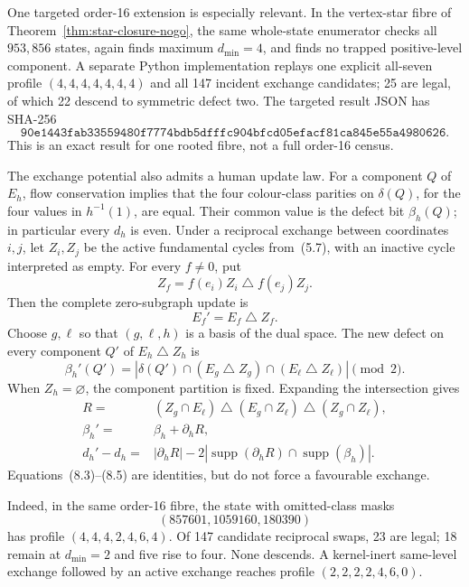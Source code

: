 \documentclass[11pt]{article}
\theoremstyle{definition}
\theoremstyle{remark}
\newcommand{\supp}{\operatorname{supp}}
\newcommand{\symdiff}{\mathbin{\triangle}}
\newcommand{\1}{\mathbf 1}
\begin{document}
One targeted order-16 extension is especially relevant.  In the
vertex-star fibre of Theorem~\ref{thm:star-closure-nogo}, the same
whole-state enumerator checks all \(953{,}856\) states, again finds maximum
\(d_{\min}=4\), and finds no trapped positive-level component.  A separate
Python implementation replays one explicit all-seven profile
\((4,4,4,4,4,4,4)\) and all 147 incident exchange candidates; 25 are
legal, of which 22 descend to symmetric defect two.  The targeted result
JSON has SHA-256
\[
\texttt{90e1443fab33559480f7774bdb5dfffc904bfcd05efacf81ca845e55a4980626}.
\]
This is an exact result for one rooted fibre, not a full order-16 census.

The exchange potential also admits a human update law.  For a component
\(Q\) of \(E_h\), flow conservation implies that the four colour-class
parities on \(\delta(Q)\), for the four values in \(h^{-1}(1)\), are equal.
Their common value is the defect bit \(\beta_h(Q)\); in particular every
\(d_h\) is even.  Under a reciprocal exchange between coordinates \(i,j\),
let \(Z_i,Z_j\) be the active fundamental cycles from~(5.7), with an
inactive cycle interpreted as empty.  For every \(f\ne0\), put
\[
 Z_f=f(e_i)Z_i\symdiff f(e_j)Z_j.
\]
Then the complete zero-subgraph update is
\[
                         E_f'=E_f\symdiff Z_f.           \tag{8.3}
\]
Choose \(g,\ell\) so that \((g,\ell,h)\) is a basis of the dual space.
The new defect on every component \(Q'\) of \(E_h\symdiff Z_h\) is
\[
 \beta_h'(Q')
 =|\delta(Q')\cap(E_g\symdiff Z_g)
                    \cap(E_\ell\symdiff Z_\ell)|\pmod2. \tag{8.4}
\]
When \(Z_h=\varnothing\), the component partition is fixed.  Expanding
the intersection gives
\begin{equation}
\begin{aligned}
 R={}&(Z_g\cap E_\ell)\symdiff(E_g\cap Z_\ell)
                         \symdiff(Z_g\cap Z_\ell),\\
 \beta_h'={}&\beta_h+\partial_hR,\\
 d_h'-d_h={}&|\partial_hR|
 -2|\supp(\partial_hR)\cap\supp(\beta_h)|.
\end{aligned}
\tag{8.5}
\end{equation}
Equations~(8.3)--(8.5) are identities, but do not force a favourable
exchange.

Indeed, in the same order-16 fibre, the state with omitted-class masks
\[
                         (857601,1059160,180390)
\]
has profile \((4,4,4,2,4,6,4)\).  Of 147 candidate reciprocal swaps, 23
are legal; 18 remain at \(d_{\min}=2\) and five rise to four.  None
descends.  A kernel-inert same-level exchange followed by an active
exchange reaches profile \((2,2,2,2,4,6,0)\).
\end{document}
